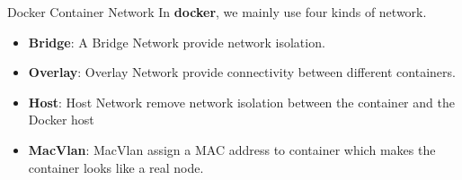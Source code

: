 \begin{frame}{Docker Container Network}
In \textbf{docker}, we mainly use four kinds of network.
    \begin{itemize}
        \pause
        \item \textbf{Bridge}: A Bridge Network provide network isolation.
        \pause
        \item \textbf{Overlay}: Overlay Network provide connectivity between different containers.
        \pause
        \item \textbf{Host}: Host Network remove network isolation between the container and the Docker host
        \pause
        \item \textbf{MacVlan}: MacVlan assign a MAC address to container which makes the container looks like a real node.
    \end{itemize}

\end{frame}